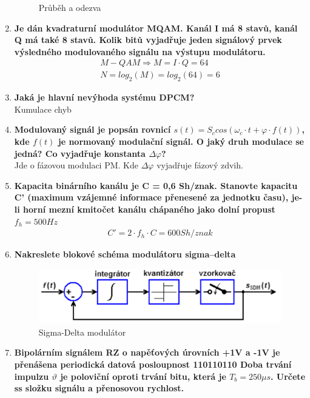 \begin{enumerate}
\begin{figure}[h]
        \caption{Průběh a odezva}
    \end{figure}
    \item \textbf{Je dán kvadraturní modulátor MQAM. Kanál I má 8 stavů, kanál Q má také 8 stavů. Kolik
    bitů vyjadřuje jeden signálový prvek výsledného modulovaného signálu na výstupu modulátoru.}
    \begin{align*}
        M-QAM \Rightarrow M = I\cdot Q = 64\\
        N = log_{2}(M) = log_{2}(64) = 6
    \end{align*}
    \item \textbf{Jaká je hlavní nevýhoda systému DPCM?}\\
    Kumulace chyb
    \item \textbf{Modulovaný signál je popsán rovnicí \(s(t) = S_c cos(\omega_c \cdot t+ \varphi\cdot f(t))\), kde \(f(t)\) je normovaný modulační signál. O jaký druh modulace se jedná? Co vyjadřuje konstanta \(\Delta \varphi\)?}\\
    Jde o fázovou modulaci PM. Kde \(\Delta \varphi\) vyjadřuje fázový zdvih.
    \item \textbf{Kapacita binárního kanálu je C = 0,6 Sh/znak. Stanovte kapacitu C' (maximum vzájemné
    informace přenesené za jednotku času), je-li horní mezní kmitočet kanálu chápaného jako
    dolní propust \(f_h = 500Hz\)}
    \begin{align*}
        C' = 2 \cdot f_h \cdot C = 600Sh/znak
    \end{align*}
    \item \textbf{Nakreslete blokové schéma modulátoru sigma–delta}
    \begin{figure}[h]
        \centering
        \includegraphics[scale = 0.7]{images/SDM.png}
        \caption{Sigma-Delta modulátor}
    \end{figure}
    \item \textbf{Bipolárním signálem RZ o napěťových úrovních +1V a -1V je přenášena periodická datová
    posloupnost 110110110 Doba trvání impulzu \(\vartheta\) je poloviční oproti trvání bitu,
    která je \(T_b = 250 \mu s\). Určete ss složku signálu a přenosovou rychlost.}
    \begin{align*}

\end{align*}
\end{enumerate}
